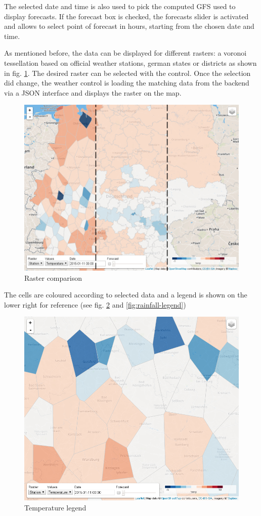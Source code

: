 \documentclass[paper=a4, fontsize=11pt]{article} %
\numberwithin{equation}{section} %
\numberwithin{figure}{section} %
\numberwithin{table}{section} %
\begin{document}
\newpage
The selected date and time is also used to pick the computed GFS used to
display forecasts. If the forecast box is checked, the forecasts slider
is activated and allows to select point of forecast in hours, starting
from the chosen date and time.

As mentioned before, the data can be displayed for different rasters: a
voronoi tessellation based on official weather stations, german states or
districts as shown in fig. \ref{fig:raster-comparison}. The desired raster can be selected with the control. Once the
selection did change, the weather control is loading the matching data
from the backend via a JSON interface and displays the raster on the
map.

\begin{figure}[htbp]
\centering
\includegraphics[width=1\textwidth]{pictures/screenshot-raster.png}
\caption{Raster comparison}
\label{fig:raster-comparison}
\end{figure}

\newpage
The cells are coloured according to selected data and a legend is shown
on the lower right for reference (see fig. \ref{fig:temperature-legend} and \ref{fig:rainfall-legend})

\begin{figure}[htbp]
\centering
\includegraphics[width=.6\textwidth]{pictures/screenshot-legend-temp.png}
\caption{Temperature legend}
\label{fig:temperature-legend}
\end{figure}
\end{document}
